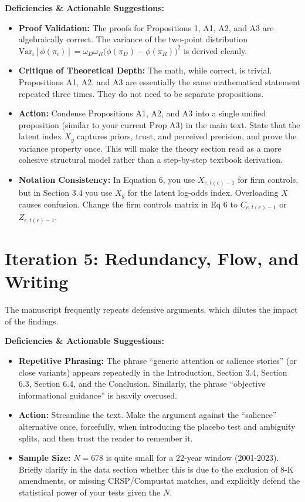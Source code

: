 \documentclass[12pt]{article}
\begin{document}
\textbf{Deficiencies \& Actionable Suggestions:}
\begin{itemize}
    \item \textbf{Proof Validation:} The proofs for Propositions 1, A1, A2, and A3 are algebraically correct. The variance of the two-point distribution $\mathrm{Var}_i[\phi(\pi_i)] = \omega_D \omega_R \bigl(\phi(\pi_D) - \phi(\pi_R)\bigr)^2$ is derived cleanly.
    \item \textbf{Critique of Theoretical Depth:} The math, while correct, is trivial. Propositions A1, A2, and A3 are essentially the same mathematical statement repeated three times. They do not need to be separate propositions.
    \item \textbf{Action:} Condense Propositions A1, A2, and A3 into a single unified proposition (similar to your current Prop A3) in the main text. State that the latent index $X_g$ captures priors, trust, and perceived precision, and prove the variance property once. This will make the theory section read as a more cohesive structural model rather than a step-by-step textbook derivation.
    \item \textbf{Notation Consistency:} In Equation 6, you use $X_{e,t(e)-1}$ for firm controls, but in Section 3.4 you use $X_g$ for the latent log-odds index. Overloading $X$ causes confusion. Change the firm controls matrix in Eq 6 to $C_{e, t(e)-1}$ or $Z_{e, t(e)-1}$.
\end{itemize}


\section{Iteration 5: Redundancy, Flow, and Writing}

The manuscript frequently repeats defensive arguments, which dilutes the impact of the findings.

\textbf{Deficiencies \& Actionable Suggestions:}
\begin{itemize}
    \item \textbf{Repetitive Phrasing:} The phrase ``generic attention or salience stories'' (or close variants) appears repeatedly in the Introduction, Section 3.4, Section 6.3, Section 6.4, and the Conclusion. Similarly, the phrase ``objective informational guidance'' is heavily overused.
    \item \textbf{Action:} Streamline the text. Make the argument against the ``salience'' alternative once, forcefully, when introducing the placebo test and ambiguity splits, and then trust the reader to remember it. 
    \item \textbf{Sample Size:} $N=678$ is quite small for a 22-year window (2001-2023). Briefly clarify in the data section whether this is due to the exclusion of 8-K amendments, or missing CRSP/Compustat matches, and explicitly defend the statistical power of your tests given the $N$.
\end{itemize}
\end{document}
